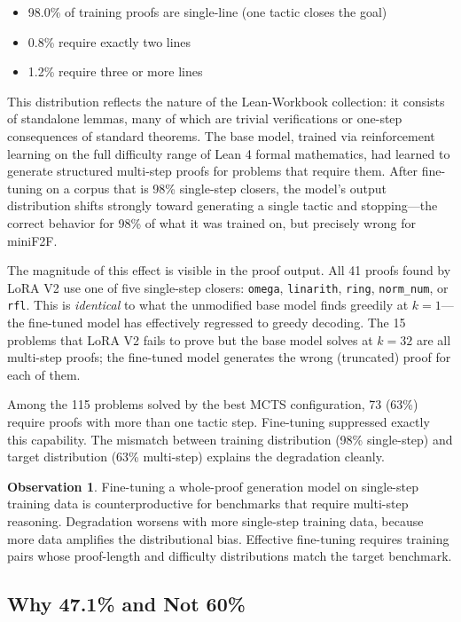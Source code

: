 \documentclass[openany, amssymb, psamsfonts]{amsart}
\theoremstyle{definition}
\newtheorem{obs}{Observation}[section]
\numberwithin{equation}{section}
\begin{document}
\begin{itemize}
\item 98.0\% of training proofs are single-line (one tactic closes the goal)
\item 0.8\% require exactly two lines
\item 1.2\% require three or more lines
\end{itemize}

This distribution reflects the nature of the Lean-Workbook collection: it
consists of standalone lemmas, many of which are trivial verifications or
one-step consequences of standard theorems.
The base model, trained via reinforcement learning on the full difficulty
range of Lean 4 formal mathematics, had learned to generate structured
multi-step proofs for problems that require them.
After fine-tuning on a corpus that is 98\% single-step closers, the model's
output distribution shifts strongly toward generating a single tactic and
stopping---the correct behavior for 98\% of what it was trained on, but
precisely wrong for miniF2F.

The magnitude of this effect is visible in the proof output.
All 41 proofs found by LoRA V2 use one of five single-step closers:
\texttt{omega}, \texttt{linarith}, \texttt{ring}, \texttt{norm\_num}, or \texttt{rfl}.
This is \emph{identical} to what the unmodified base model finds greedily
at $k=1$---the fine-tuned model has effectively regressed to greedy decoding.
The 15 problems that LoRA V2 fails to prove but the base model solves
at $k=32$ are all multi-step proofs; the fine-tuned model generates the
wrong (truncated) proof for each of them.

Among the 115 problems solved by the best MCTS configuration, 73 (63\%)
require proofs with more than one tactic step.
Fine-tuning suppressed exactly this capability.
The mismatch between training distribution (98\% single-step) and target
distribution (63\% multi-step) explains the degradation cleanly.

\begin{obs}
Fine-tuning a whole-proof generation model on single-step training data
is counterproductive for benchmarks that require multi-step reasoning.
Degradation worsens with more single-step training data, because more data
amplifies the distributional bias.
Effective fine-tuning requires training pairs whose proof-length and
difficulty distributions match the target benchmark.
\end{obs}

\subsection{Why 47.1\% and Not 60\%}
\label{sec:gap}
\end{document}
